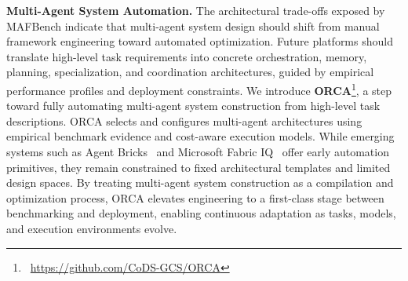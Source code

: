 \smallskip
\noindent\textbf{Multi-Agent System Automation.}
The architectural trade-offs exposed by MAFBench indicate that multi-agent system design should shift from manual framework engineering toward automated optimization. Future platforms should translate high-level task requirements into concrete orchestration, memory, planning, specialization, and coordination architectures, guided by empirical performance profiles and deployment constraints.  
%
We introduce \textbf{ORCA}\footnote{\vspace{-2mm}\faGithub\ \url{https://github.com/CoDS-GCS/ORCA}}, a step toward fully automating multi-agent system construction from high-level task descriptions. ORCA selects and configures multi-agent architectures using empirical benchmark evidence and cost-aware execution models. While emerging systems such as Agent Bricks~\cite{databricks_agentbricks} and Microsoft Fabric IQ~\cite{microsoft_fabric_iq} offer early automation primitives, they remain constrained to fixed architectural templates and limited design spaces. By treating multi-agent system construction as a compilation and optimization process, ORCA elevates engineering to a first-class stage between benchmarking and deployment, enabling continuous adaptation as tasks, models, and execution environments evolve.\shorten


